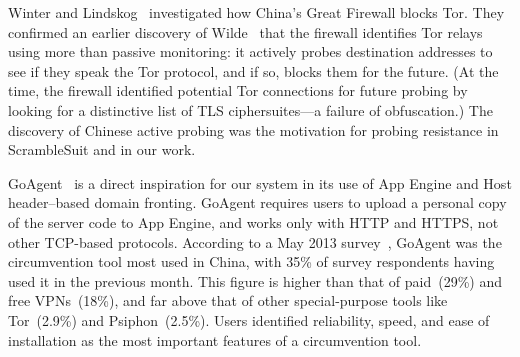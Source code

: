 \documentclass{article}
\begin{document}

Winter and Lindskog~\cite{foci12-winter} investigated how China's Great Firewall blocks Tor.
They confirmed an earlier discovery of Wilde~\cite{wilde} that the firewall identifies Tor relays using more than passive monitoring:
it actively probes destination addresses to see if they speak the Tor protocol, and if so,
blocks them for the future.
(At the time, the firewall identified potential Tor connections for future probing by looking for a distinctive
list of TLS ciphersuites---a failure of obfuscation.) %
The discovery of Chinese active probing was the motivation for probing resistance in ScrambleSuit
and in our work.

GoAgent~\cite{goagent} is a direct inspiration for our system in its use of App
Engine and Host header--based domain fronting. GoAgent requires users to upload
a personal copy of the server code to App Engine, and works only with HTTP and HTTPS,
not other TCP-based protocols.
According to a May 2013 survey~\cite{collateral-freedom},
GoAgent was the circumvention tool most used in
China, with 35\% of survey respondents having used it in the previous month.
This figure is higher than that of paid~(29\%) and free VPNs~(18\%), and far
above that of other special-purpose tools like Tor~(2.9\%) and Psiphon~(2.5\%).
Users identified reliability, speed, and ease of installation as the most important features of a circumvention tool.


  

\end{document}

